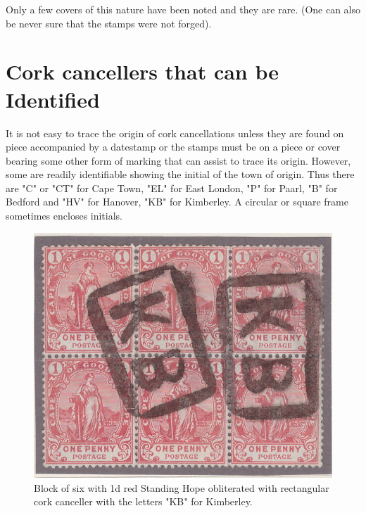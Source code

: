 Only a few covers of this nature have been noted and they are rare. (One can also be never sure that the stamps were not forged).

\section{Cork cancellers that can be Identified}

 It is not easy to trace the origin of cork cancellations unless they are found on piece accompanied by a datestamp or the stamps must be on a piece or cover bearing some other form of marking that can assist to trace its origin. However, some are readily identifiable showing the initial of the town of origin. Thus there are "C" or "CT" for Cape Town, "EL" for East London, "P" for Paarl, "B" for Bedford and "HV" for Hanover, "KB" for Kimberley. A circular or square frame sometimes encloses initials.

\begin{figure}
\includegraphics[width=1.0\textwidth]{../cape-of-good-hope/cork-kimberley-01.jpg}
\caption{Block of six with 1d red Standing Hope obliterated with rectangular cork canceller with the letters "KB" for Kimberley.}
\end{figure}

